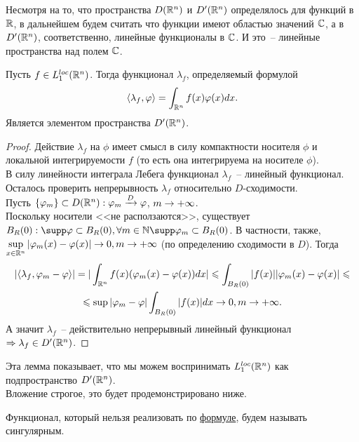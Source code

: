 
\begin{remark}
    Несмотря на то, что пространства $D(\mathbb{R}^n)$ и $D'(\mathbb{R}^n)$ определялось для функций в $\mathbb{R}$, в дальнейшем будем считать что функции имеют областью значений $\mathbb{C}$, а в $D'(\mathbb{R}^n)$, соответственно, линейные функционалы в $\mathbb{C}$.
    И это~-- линейные пространства над полем $\mathbb{C}$.
\end{remark}
\begin{lemma}
    Пусть $f \in L_1^{loc}(\mathbb{R}^n)$.
    Тогда функционал $\lambda_f$, определяемый формулой
    \[
        \langle \lambda_f, \varphi \rangle= \int_{\mathbb{R}^n} f(x) \varphi(x) dx. \label{lambda_f_functional}
    \]
    Является элементом пространства $D'(\mathbb{R}^n)$.
\end{lemma}
\begin{proof}
    Действие $\lambda_f$ на $\phi$ имеет смысл в силу компактности носителя $\phi$ и локальной интегрируемости $f$ (то есть она интегрируема на носителе $\phi$). \\
    В силу линейности интеграла Лебега функционал $\lambda_f$~-- линейный функционал. \\
    Осталось проверить непрерывность $\lambda_f$ относительно $D$-сходимости. \\
    Пусть $\{\varphi_m\} \subset D(\mathbb{R}^n): \varphi_m \xrightarrow{D} \varphi$, $m \rightarrow +\infty$.  
    \\
    Поскольку носители <<не расползаются>>, существует $B_R(0): \supp \phi \subset B_R(0), \forall m \in \N \supp \phi_m \subset B_R(0)$.
    В частности, также, $\sup\limits_{x \in \mathbb{R}^n}|\varphi_m(x) - \varphi(x)| \rightarrow 0, m \rightarrow +\infty$ (по определению сходимости в $D$).
    Тогда
    \begin{multline*}
        |\langle \lambda_f, \varphi_m - \varphi \rangle | = |\int_{\mathbb{R}^n} f(x)(\varphi_m(x) - \varphi(x))dx| \leqslant \int_{B_R(0)} |f(x)||\varphi_m(x) - \varphi(x)| \leqslant \\ \leqslant \sup |\varphi_m - \varphi| \int_{B_R(0)} |f(x)|dx \rightarrow 0, m \rightarrow +\infty.
    \end{multline*}
    А значит $\lambda_f$~-- действительно непрерывный линейный функционал $\Rightarrow \lambda_f \in D'(\mathbb{R}^n)$.
\end{proof}
\begin{note}
    Эта лемма показывает, что мы можем воспринимать $L_1^{loc}(\mathbb{R}^n)$ как подпространство $D'(\mathbb{R}^n)$. \\
    Вложение строгое, это будет продемонстрировано ниже.
\end{note}
\begin{definition}
Функционал, который нельзя реализовать по 
\hyperref[lambda_f_functional]{формуле}, будем называть сингулярным.
\end{definition}

